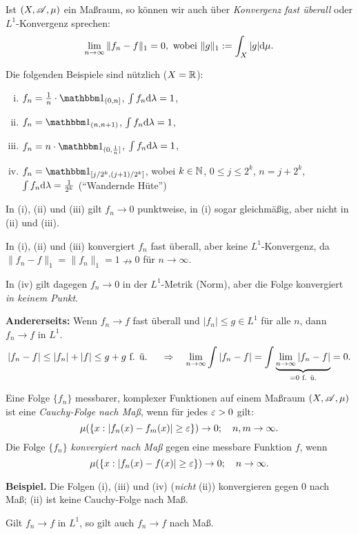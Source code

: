 Ist $(X, \mathscr{A}, \mu)$ ein Maßraum, so können wir auch über \emph{Konvergenz fast überall} oder $L^1$-Konvergenz sprechen:
\[ \lim_{n \to \infty} \| f_n - f \|_1 = 0, \text{ wobei } \| g \|_1 := \int_X |g| \mathrm{d} \mu. \]

Die folgenden Beispiele sind nützlich ($X = \mathbb{R}$):
\begin{enumerate}[(i)]
 \item $f_n = \rez{n} \cdot \ind_{(0, n]}$, $\int f_n \mathrm{d} \lambda = 1$,
 \item $f_n = \ind_{(n,n+1)}$, $\int f_n \mathrm{d} \lambda = 1$,
 \item $f_n = n \cdot \ind_{(0,\rez{n}]}$, $\int f_n \mathrm{d} \lambda = 1$,
 \item $f_n = \ind_{[j/2^k,(j+1)/2^k]}$, wobei $k \in \mathbb{N}$, $0 \le j \le 2^k$, $n = j + 2^k$, $\int f_n \mathrm{d} \lambda = \frac{1}{2^k}$ (``Wandernde Hüte'')
\end{enumerate}

In (i), (ii) und (iii) gilt $f_n \to 0$ punktweise, in (i) sogar gleichmäßig, aber nicht in (ii) und (iii).

In (i), (ii) und (iii) konvergiert $f_n$ fast überall, aber keine $L^1$-Konvergenz, da $\| f_n - f \|_1 = \| f_n \|_1 = 1 \nrightarrow 0$ für $n \to \infty$.

In (iv) gilt dagegen $f_n \to 0$ in der $L^1$-Metrik (Norm), aber die Folge konvergiert \emph{in keinem Punkt}.

\textbf{Andererseits:} Wenn $f_n \to f$ fast überall und $| f_n | \le g \in L^1$ für alle $n$, dann $f_n \to f$ in $L^1$.
\[ |f_n - f| \le | f_n | + | f | \le g + g \text{ f. ü. } \quad \Rightarrow \quad \lim_{n \to \infty} \int | f_n - f | = \int \underbrace{\lim_{n \to \infty} | f_n - f |}_{= 0 \text{ f. ü.}} = 0.\]

\begin{defn}
 Eine Folge $\{f_n\}$ messbarer, komplexer Funktionen auf einem Maßraum $(X,\mathscr{A},\mu)$ ist eine \emph{Cauchy-Folge nach Maß}, wenn für jedes $\varepsilon > 0$ gilt:
 \[ \mu( \{ x : | f_n(x) - f_m(x) | \ge \varepsilon \} ) \to 0; \quad n, m \to \infty. \]
 Die Folge $\{ f_n \}$ \emph{konvergiert nach Maß} gegen eine messbare Funktion $f$, wenn
 \[ \mu( \{ x : | f_n(x) - f(x) | \ge \varepsilon \} ) \to 0; \quad n \to \infty. \]
\end{defn}

\textbf{Beispiel.} Die Folgen (i), (iii) und (iv) (\emph{nicht} (ii)) konvergieren gegen 0 nach Maß; (ii) ist keine Cauchy-Folge nach Maß.

\begin{lem}
 Gilt $f_n \to f$ in $L^1$, so gilt auch $f_n \to f$ nach Maß.
\end{lem}

